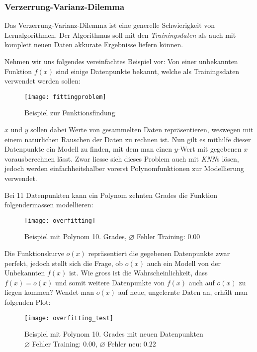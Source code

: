 \subsubsection{Verzerrung-Varianz-Dilemma \cite{bias}}
Das Verzerrung-Varianz-Dilemma ist eine generelle Schwierigkeit von Lernalgorithmen. Der Algorithmus soll mit den \textit{Trainingsdaten} als auch mit komplett neuen Daten akkurate Ergebnisse liefern können.

Nehmen wir uns folgendes vereinfachtes Beispiel vor: Von einer unbekannten Funktion $f(x)$ sind einige Datenpunkte bekannt, welche als Trainingsdaten verwendet werden sollen:

\begin{figure}[h]
	\centering
	\texttt{[image: fittingproblem]}
	\caption[Beispiel zur Funktionsfindung]{Beispiel zur Funktionsfindung}
\end{figure}

$x$ und $y$ sollen dabei Werte von gesammelten Daten repräsentieren, weswegen mit einem natürlichen Rauschen der Daten zu rechnen ist. Nun gilt es mithilfe dieser Datenpunkte ein Modell zu finden, mit dem man einen $y$-Wert mit gegebenen $x$ vorausberechnen lässt. Zwar liesse sich dieses Problem auch mit \textit{KNN}s lösen, jedoch werden einfachheitshalber vorerst Polynomfunktionen zur Modellierung verwendet.

Bei 11 Datenpunkten kann ein Polynom zehnten Grades die Funktion folgendermassen modellieren:

\begin{figure}[h]
	\centering
	\texttt{[image: overfitting]}
	\caption[Beispiel mit Polynom 10. Grades]{Beispiel mit Polynom 10. Grades,  $\diameter$ Fehler Training: $0.00$}
\end{figure}

Die Funktionskurve $o(x)$ repräsentiert die gegebenen Datenpunkte zwar perfekt, jedoch stellt sich die Frage, ob  $o(x)$ auch ein Modell von der Unbekannten $f(x)$ ist. Wie gross ist die Wahrscheinlichkeit, dass $f(x) = o(x)$ und somit weitere Datenpunkte von $f(x)$ auch auf $o(x)$ zu liegen kommen? Wendet man $o(x)$ auf neue, ungelernte Daten an, erhält man folgenden Plot:

\begin{figure}[h]
	\centering
	\texttt{[image: overfitting\_test]}
	\caption[Beispiel mit Polynom 10. Grades mit neuen Datenpunkten]{Beispiel mit Polynom 10. Grades mit neuen Datenpunkten\\ $\diameter$ Fehler Training: $0.00$, $\diameter$ Fehler neu: $0.22$}
\end{figure}

